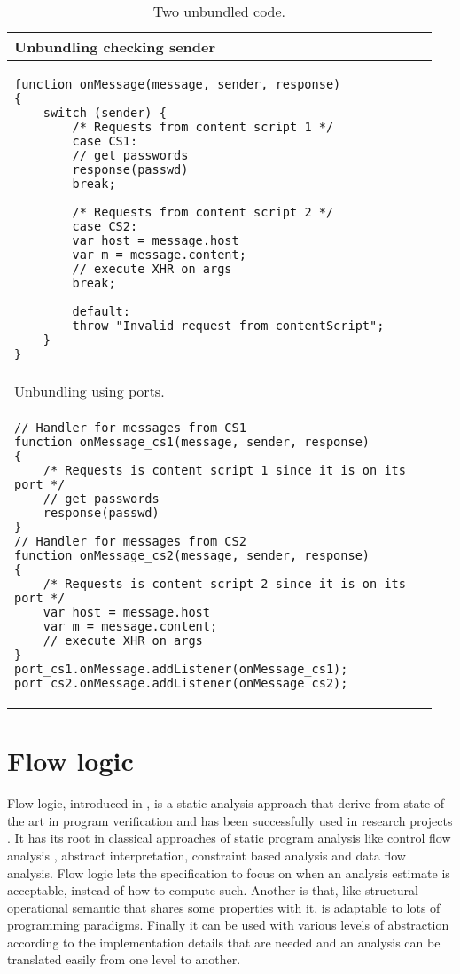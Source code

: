 \begin{table}[tlb]
\begin{small}
\begin{center}
\begin{tabular}{p{0.95\linewidth}}
Unbundling checking sender\\
\hline
\begin{lstlisting}
function onMessage(message, sender, response)
{    	
	switch (sender) {
		/* Requests from content script 1 */
		case CS1:
		// get passwords
		response(passwd)
		break;
		
		/* Requests from content script 2 */
		case CS2:
		var host = message.host
		var m = message.content;
		// execute XHR on args
		break;
				
		default:
		throw "Invalid request from contentScript";
	}
}
\end{lstlisting}\\
\hline
\hline
Unbundling using ports.\\
\hline
\begin{lstlisting}
// Handler for messages from CS1
function onMessage_cs1(message, sender, response)
{    	
	/* Requests is content script 1 since it is on its port */
	// get passwords
	response(passwd)
}
// Handler for messages from CS2
function onMessage_cs2(message, sender, response)
{    	
	/* Requests is content script 2 since it is on its port */
	var host = message.host
	var m = message.content;
	// execute XHR on args
}
port_cs1.onMessage.addListener(onMessage_cs1);
port_cs2.onMessage.addListener(onMessage_cs2);
\end{lstlisting}\\
\hline
\end{tabular}
\end{center}
\end{small}
\caption{Two unbundled code.}
\label{tab:UnBundled}
\end{table}

\section{Flow logic}
\label{sec:FlowLogic}
Flow logic, introduced in \cite{FlowLogic}, is a static analysis approach that derive from state of the art in program verification and has been successfully used in research projects \cite{CarmelFlowLogic,CarmelFlowLogicFormalization}. It has its root in classical approaches of static program analysis \cite{PrincipleProgramAnalysis} like control flow analysis \cite{CMLCFA}, abstract interpretation, constraint based analysis and data flow analysis. Flow logic lets the specification to focus on when an analysis estimate is acceptable, instead of how to compute such. Another is that, like structural operational semantic that shares some properties with it, is adaptable to lots of programming paradigms. Finally it can be used with various levels of abstraction according to the implementation details that are needed and an analysis can be translated easily from one level to another. %

